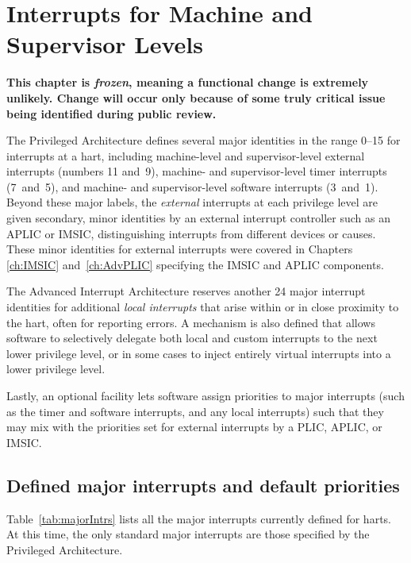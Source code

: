 
\chapter{Interrupts for Machine and Supervisor Levels}
\label{ch:MSLevel}

\textbf{%
This chapter is \emph{frozen}, meaning
a functional change is extremely unlikely.
Change will occur only because of some truly critical issue
being identified during public review.%
}
\bigskip

The {\RISCV} Privileged Architecture defines several major identities
in the range 0--15 for interrupts at a hart, including machine-level
and supervisor-level external interrupts (numbers 11 and~9), machine-
and supervisor-level timer interrupts (7~and~5), and machine- and
supervisor-level software interrupts (3~and~1).
Beyond these major labels, the \emph{external} interrupts at each
privilege level are given secondary, minor identities by an external
interrupt controller such as an APLIC or IMSIC, distinguishing interrupts
from different devices or causes.
These minor identities for external interrupts were covered in Chapters
\ref{ch:IMSIC} and~\ref{ch:AdvPLIC} specifying the IMSIC and
APLIC components.

The Advanced Interrupt Architecture reserves another 24 major
interrupt identities for additional \emph{local interrupts}
that arise within or in close proximity to the hart, often for
reporting errors.
A mechanism is also defined that allows software to
selectively delegate both local and custom interrupts to the next lower
privilege level, or in some cases to inject entirely virtual interrupts
into a lower privilege level.

Lastly, an optional facility lets software assign priorities to major
interrupts (such as the timer and software interrupts, and any local
interrupts) such that they may mix with the priorities set for external
interrupts by a PLIC, APLIC, or IMSIC.

\section{Defined major interrupts and default priorities}
\label{sec:majorIntrs}

Table~\ref{tab:majorIntrs} lists all the major interrupts
currently defined for {\RISCV} harts.
At this time, the only standard major interrupts are those
specified by the {\RISCV} Privileged Architecture.

